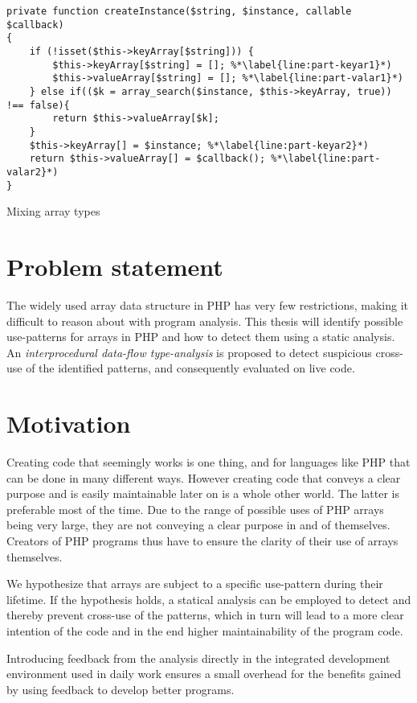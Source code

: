 \begin{program}
\centering 
\begin{lstlisting}
private function createInstance($string, $instance, callable $callback)
{
    if (!isset($this->keyArray[$string])) {
        $this->keyArray[$string] = []; %*\label{line:part-keyar1}*)
        $this->valueArray[$string] = []; %*\label{line:part-valar1}*)
    } else if(($k = array_search($instance, $this->keyArray, true)) !== false){
        return $this->valueArray[$k];
    }
    $this->keyArray[] = $instance; %*\label{line:part-keyar2}*)
    return $this->valueArray[] = $callback(); %*\label{line:part-valar2}*)
}
\end{lstlisting}
\caption{Mixing array types}
\end{program}

\section{Problem statement}
The widely used array data structure in PHP has very few restrictions, making it difficult to reason about with program analysis. This thesis will identify possible use-patterns for arrays in PHP and how to detect them using a static analysis. An \emph{interprocedural data-flow type-analysis} is proposed to detect suspicious cross-use of the identified patterns, and consequently evaluated on live code.

\section{Motivation}
Creating code that seemingly works is one thing, and for languages like PHP that can be done in many different ways. However creating code that conveys a clear purpose and is easily maintainable later on is a whole other world. The latter is preferable most of the time. Due to the range of possible uses of PHP arrays being very large, they are not conveying a clear purpose in and of themselves. Creators of PHP programs thus have to ensure the clarity of their use of arrays themselves. 

We hypothesize that arrays are subject to a specific use-pattern during their lifetime. If the hypothesis holds, a statical analysis can be employed to detect and thereby prevent cross-use of the patterns, which in turn will lead to a more clear intention of the code and in the end higher maintainability of the program code.

Introducing feedback from the analysis directly in the integrated development environment used in daily work ensures a small overhead for the benefits gained by using feedback to develop better programs.

